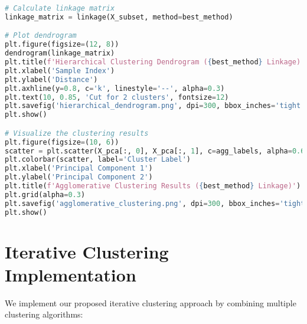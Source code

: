 \begin{lstlisting}[language=Python, caption=Agglomerative Clustering Implementation and Parameter Tuning]
# Calculate linkage matrix
linkage_matrix = linkage(X_subset, method=best_method)

# Plot dendrogram
plt.figure(figsize=(12, 8))
dendrogram(linkage_matrix)
plt.title(f'Hierarchical Clustering Dendrogram ({best_method} Linkage)')
plt.xlabel('Sample Index')
plt.ylabel('Distance')
plt.axhline(y=0.8, c='k', linestyle='--', alpha=0.3)
plt.text(10, 0.85, 'Cut for 2 clusters', fontsize=12)
plt.savefig('hierarchical_dendrogram.png', dpi=300, bbox_inches='tight')
plt.show()

# Visualize the clustering results
plt.figure(figsize=(10, 6))
scatter = plt.scatter(X_pca[:, 0], X_pca[:, 1], c=agg_labels, alpha=0.6, cmap='viridis')
plt.colorbar(scatter, label='Cluster Label')
plt.xlabel('Principal Component 1')
plt.ylabel('Principal Component 2')
plt.title(f'Agglomerative Clustering Results ({best_method} Linkage)')
plt.grid(alpha=0.3)
plt.savefig('agglomerative_clustering.png', dpi=300, bbox_inches='tight')
plt.show()
\end{lstlisting}

\section{Iterative Clustering Implementation}
We implement our proposed iterative clustering approach by combining multiple clustering algorithms:

